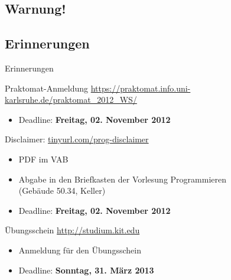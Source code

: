 \documentclass[usepdftitle=false,hyperref={pdfpagelabels=false}]{beamer}
\begin{document}
\subsection{Warnung!}

\subsection{Erinnerungen}
\begin{frame}{Erinnerungen}

\begin{block}{Praktomat-Anmeldung}
\url{https://praktomat.info.uni-karlsruhe.de/praktomat\_2012\_WS/}
\begin{itemize}
\item Deadline: \textbf{Freitag, 02. November 2012}
\end{itemize}
\end{block}

\begin{block}{Disclaimer: \href{http://tinyurl.com/prog-disclaimer}{tinyurl.com/prog-disclaimer}}
\begin{itemize}
\item PDF im VAB
\item Abgabe in den Briefkasten der Vorlesung Programmieren\\(Gebäude 50.34, Keller)
\item Deadline: \textbf{Freitag, 02. November 2012}
\end{itemize}
\end{block}

\begin{block}{Übungsschein \href{studium.kit.edu}{http://studium.kit.edu}}
\begin{itemize}
\item Anmeldung für den Übungsschein
\item Deadline: \textbf{Sonntag, 31. März 2013}
\end{itemize}
\end{block}
\end{frame}
\end{document}
